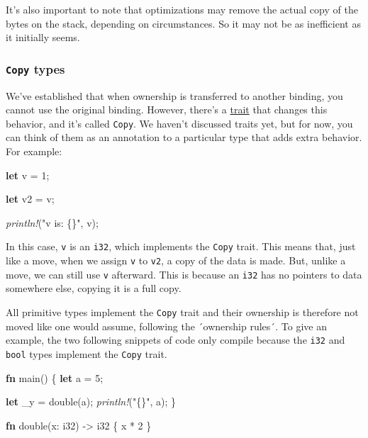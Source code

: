 \documentclass[a4paper,]{book}
\newenvironment{Shaded}{\begin{snugshade}}{\end{snugshade}}
\newcommand{\KeywordTok}[1]{\textcolor[rgb]{0.13,0.29,0.53}{\textbf{{#1}}}}
\newcommand{\DataTypeTok}[1]{\textcolor[rgb]{0.13,0.29,0.53}{{#1}}}
\newcommand{\DecValTok}[1]{\textcolor[rgb]{0.00,0.00,0.81}{{#1}}}
\newcommand{\StringTok}[1]{\textcolor[rgb]{0.31,0.60,0.02}{{#1}}}
\newcommand{\PreprocessorTok}[1]{\textcolor[rgb]{0.56,0.35,0.01}{\textit{{#1}}}}
\newcommand{\NormalTok}[1]{{#1}}
\begin{document}
It's also important to note that optimizations may remove the actual
copy of the bytes on the stack, depending on circumstances. So it may
not be as inefficient as it initially seems.

\subsubsection{\texorpdfstring{\texttt{Copy}
types}{Copy types}}\label{copy-types}

We've established that when ownership is transferred to another binding,
you cannot use the original binding. However, there's a
\protect\hyperlink{sec--traits}{trait} that changes this behavior, and
it's called \texttt{Copy}. We haven't discussed traits yet, but for now,
you can think of them as an annotation to a particular type that adds
extra behavior. For example:

\begin{Shaded}
\begin{Highlighting}[]
\KeywordTok{let} \NormalTok{v = }\DecValTok{1}\NormalTok{;}

\KeywordTok{let} \NormalTok{v2 = v;}

\PreprocessorTok{println!}\NormalTok{(}\StringTok{"v is: \{\}"}\NormalTok{, v);}
\end{Highlighting}
\end{Shaded}

In this case, \texttt{v} is an \texttt{i32}, which implements the
\texttt{Copy} trait. This means that, just like a move, when we assign
\texttt{v} to \texttt{v2}, a copy of the data is made. But, unlike a
move, we can still use \texttt{v} afterward. This is because an
\texttt{i32} has no pointers to data somewhere else, copying it is a
full copy.

All primitive types implement the \texttt{Copy} trait and their
ownership is therefore not moved like one would assume, following the
´ownership rules´. To give an example, the two following snippets of
code only compile because the \texttt{i32} and \texttt{bool} types
implement the \texttt{Copy} trait.

\begin{Shaded}
\begin{Highlighting}[]
\KeywordTok{fn} \NormalTok{main() \{}
    \KeywordTok{let} \NormalTok{a = }\DecValTok{5}\NormalTok{;}

    \KeywordTok{let} \NormalTok{_y = double(a);}
    \PreprocessorTok{println!}\NormalTok{(}\StringTok{"\{\}"}\NormalTok{, a);}
\NormalTok{\}}

\KeywordTok{fn} \NormalTok{double(x: }\DataTypeTok{i32}\NormalTok{) -> }\DataTypeTok{i32} \NormalTok{\{}
    \NormalTok{x * }\DecValTok{2}
\NormalTok{\}}
\end{Highlighting}
\end{Shaded}
\end{document}
